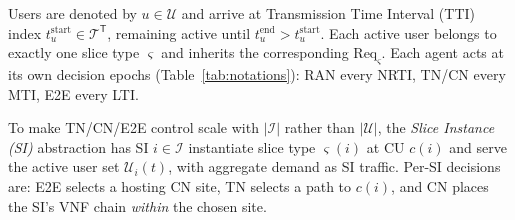 \documentclass[12pt,lettersize,journal,onecolumn]{IEEEtran}
\begin{document}
Users are denoted by $u\in\mathcal{U}$ and arrive at Transmission Time Interval (TTI) index $t_u^{\mathrm{start}}\in\mathcal{T}^{\mathsf{T}}$, remaining active until $t_u^{\mathrm{end}}>t_u^{\mathrm{start}}$. Each active user belongs to exactly one slice type $\varsigma$ and inherits the corresponding $\mathrm{Req}_{\varsigma}$. %
Each agent acts at its own decision epochs (Table~\ref{tab:notations}): RAN every NRTI, TN/CN every MTI, E2E every LTI.

To make TN/CN/E2E control scale with $|\mathcal{I}|$ rather than $|\mathcal{U}|$, the \textit{Slice Instance (SI)} abstraction has SI $i\in\mathcal{I}$ instantiate slice type $\varsigma(i)$ at CU $c(i)$ and serve the active user set $\mathcal{U}_i(t)$, with aggregate demand as SI traffic. Per-SI decisions are: E2E selects a hosting CN site, TN selects a path to $c(i)$, and CN places the SI's VNF chain \emph{within} the chosen site.
%
%
\end{document}
